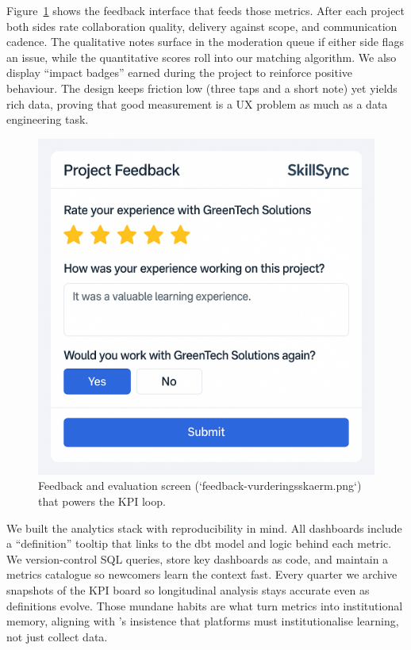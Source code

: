 Figure~\ref{fig:feedback-screen} shows the feedback interface that feeds those metrics. After each project both sides rate collaboration quality, delivery against scope, and communication cadence. The qualitative notes surface in the moderation queue if either side flags an issue, while the quantitative scores roll into our matching algorithm. We also display ``impact badges'' earned during the project to reinforce positive behaviour. The design keeps friction low (three taps and a short note) yet yields rich data, proving that good measurement is a UX problem as much as a data engineering task.

\begin{figure}[h]
  \centering
  \includegraphics[width=0.8\linewidth]{figures/opgave08/feedback-vurderingsskaerm.png}
  \caption{Feedback and evaluation screen (`feedback-vurderingsskaerm.png`) that powers the KPI loop.}
  \label{fig:feedback-screen}
\end{figure}

We built the analytics stack with reproducibility in mind. All dashboards include a ``definition'' tooltip that links to the dbt model and logic behind each metric. We version-control SQL queries, store key dashboards as code, and maintain a metrics catalogue so newcomers learn the context fast. Every quarter we archive snapshots of the KPI board so longitudinal analysis stays accurate even as definitions evolve. Those mundane habits are what turn metrics into institutional memory, aligning with \citet{Choudary2016}'s insistence that platforms must institutionalise learning, not just collect data.

